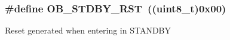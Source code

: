 \subsubsection[{\texorpdfstring{O\+B\+\_\+\+S\+T\+D\+B\+Y\+\_\+\+R\+ST}{OB_STDBY_RST}}]{\setlength{\rightskip}{0pt plus 5cm}\#define O\+B\+\_\+\+S\+T\+D\+B\+Y\+\_\+\+R\+ST~((uint8\+\_\+t)0x00)}\hypertarget{group___f_l_a_s_h_ex___option___bytes__n_r_s_t___s_t_d_b_y_ga69451a6f69247528f58735c9c83499ce}{}\label{group___f_l_a_s_h_ex___option___bytes__n_r_s_t___s_t_d_b_y_ga69451a6f69247528f58735c9c83499ce}
Reset generated when entering in S\+T\+A\+N\+D\+BY 